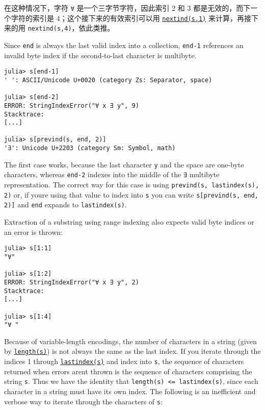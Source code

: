 在这种情况下，字符 \texttt{∀} 是一个三字节字符，因此索引 2 和 3 都是无效的，而下一个字符的索引是 4；这个接下来的有效索引可以用 \hyperlink{7455293228649070526}{\texttt{nextind(s,1)}} 来计算，再接下来的用 \texttt{nextind(s,4)}，依此类推。



Since \texttt{end} is always the last valid index into a collection, \texttt{end-1} references an invalid byte index if the second-to-last character is multibyte.




\begin{verbatim}
julia> s[end-1]
' ': ASCII/Unicode U+0020 (category Zs: Separator, space)

julia> s[end-2]
ERROR: StringIndexError("∀ x ∃ y", 9)
Stacktrace:
[...]

julia> s[prevind(s, end, 2)]
'∃': Unicode U+2203 (category Sm: Symbol, math)
\end{verbatim}



The first case works, because the last character \texttt{y} and the space are one-byte characters, whereas \texttt{end-2} indexes into the middle of the \texttt{∃} multibyte representation. The correct way for this case is using \texttt{prevind(s, lastindex(s), 2)} or, if you{\textquotesingle}re using that value to index into \texttt{s} you can write \texttt{s[prevind(s, end, 2)]} and \texttt{end} expands to \texttt{lastindex(s)}.



Extraction of a substring using range indexing also expects valid byte indices or an error is thrown:




\begin{verbatim}
julia> s[1:1]
"∀"

julia> s[1:2]
ERROR: StringIndexError("∀ x ∃ y", 2)
Stacktrace:
[...]

julia> s[1:4]
"∀ "
\end{verbatim}



Because of variable-length encodings, the number of characters in a string (given by \hyperlink{3699181304419743826}{\texttt{length(s)}}) is not always the same as the last index. If you iterate through the indices 1 through \hyperlink{15780929618270241785}{\texttt{lastindex(s)}} and index into \texttt{s}, the sequence of characters returned when errors aren{\textquotesingle}t thrown is the sequence of characters comprising the string \texttt{s}. Thus we have the identity that \texttt{length(s) <= lastindex(s)}, since each character in a string must have its own index. The following is an inefficient and verbose way to iterate through the characters of \texttt{s}:




